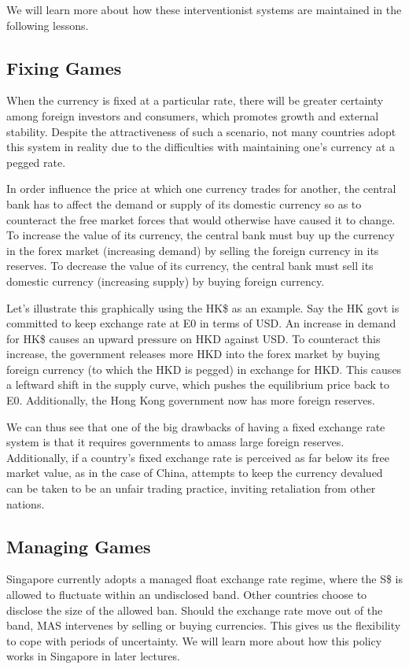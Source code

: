 \documentclass[DIV=classic,11pt,numbers=noenddot,parskip]{scrartcl}
\begin{document}
We will learn more about how these interventionist systems are maintained in the following lessons.
\subsection{Fixing Games}
When the currency is fixed at a particular rate, there will be greater certainty among foreign investors and consumers, which promotes growth and external stability. Despite the attractiveness of such a scenario, not many countries adopt this system in reality due to the difficulties with maintaining one’s currency at a pegged rate.

In order influence the price at which one currency trades for another, the central bank has to affect the demand or supply of its domestic currency so as to counteract the free market forces that would otherwise have caused it to change. To increase the value of its currency, the central bank must buy up the currency in the forex market (increasing demand) by selling the foreign currency in its reserves. To decrease the value of its currency, the central bank must sell its domestic currency (increasing supply) by buying foreign currency.

 Let’s illustrate this graphically using the HK\$ as an example. Say the HK govt is committed to keep exchange rate at E0 in terms of USD. An increase in demand for HK\$ causes an upward pressure on HKD against USD. To counteract this increase, the government releases more HKD into the forex market by buying foreign currency (to which the HKD is pegged) in exchange for HKD. This causes a leftward shift in the supply curve, which pushes the equilibrium price back to E0. Additionally, the Hong Kong government now has more foreign reserves.

We can thus see that one of the big drawbacks of having a fixed exchange rate system is that it requires governments to amass large foreign reserves. Additionally, if a country’s fixed exchange rate is perceived as far below its free market value, as in the case of China, attempts to keep the currency devalued can be taken to be an unfair trading practice, inviting retaliation from other nations.
\subsection{Managing Games}
Singapore currently adopts a managed float exchange rate regime, where the S\$ is allowed to fluctuate within an undisclosed band. Other countries choose to disclose the size of the allowed ban. Should the exchange rate move out of the band, MAS intervenes by selling or buying currencies. This gives us the flexibility to cope with periods of uncertainty. We will learn more about how this policy works in Singapore in later lectures.
\end{document}
